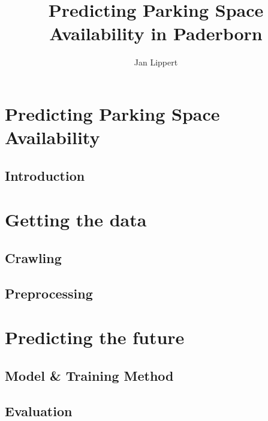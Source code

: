 \documentclass[11pt]{beamer}
\begin{document}
\author{Jan Lippert}
\title{Predicting Parking Space Availability in Paderborn}
\frame[plain]{\maketitle}



\section{Predicting Parking Space Availability}
\subsection{Introduction}
\begin{frame}
  \frametitle{}
\end{frame}

\section{Getting the data}
\subsection{Crawling}
\begin{frame}
  \frametitle{}
\end{frame}

\subsection{Preprocessing}
\begin{frame}
  \frametitle{}
\end{frame}


\section{Predicting the future}
\subsection{Model \& Training Method}
\begin{frame}
  \frametitle{}
\end{frame}

\subsection{Evaluation}
\begin{frame}
  \frametitle{}
\end{frame}
\end{document}
